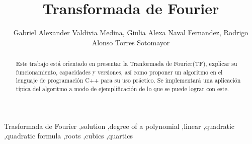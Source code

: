 \documentclass[review,1p]{elsarticle}
\begin{document}
\makeatletter
\def\ps@pprintTitle{%
  \let\@oddhead\@empty
  \let\@evenhead\@empty
  \let\@oddfoot\@empty
  \let\@evenfoot\@oddfoot
}
\makeatother

\begin{frontmatter}


\title{Transformada de Fourier}




\author{Gabriel Alexander Valdivia Medina, Giulia Alexa Naval Fernandez, Rodrigo Alonso Torres Sotomayor}

\address{Universidad Católica San Pablo, Arequipa.}

\begin{abstract}
Este trabajo está orientado en presentar la Tranformada de Fourier(TF),
explicar su funcionamiento, capacidades y versiones, así como proponer un
algoritmo en el lenguaje de programación C++ para su uso práctico. Se implementará 
una aplicación típica del algoritmo a modo de ejemplificación de lo que se puede
lograr con este. 
\end{abstract}

\begin{keyword}
Trasformada de Fourier \sep solution \sep degree of a polynomial \sep linear 
\sep quadratic \sep quadratic formula \sep roots \sep cubics \sep quartics


\end{keyword}

\end{frontmatter}
\end{document}
